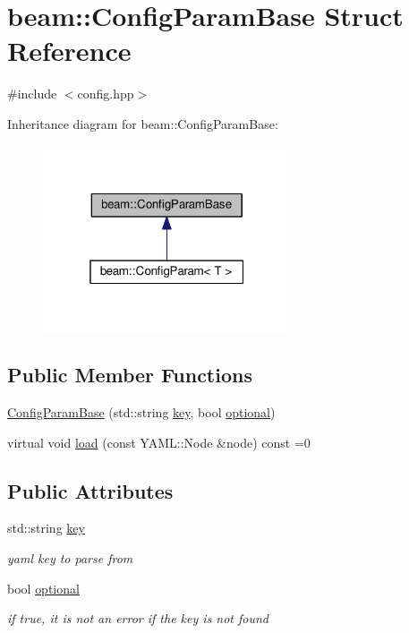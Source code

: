 \hypertarget{structbeam_1_1_config_param_base}{}\section{beam\+:\+:Config\+Param\+Base Struct Reference}
\label{structbeam_1_1_config_param_base}


{\ttfamily \#include $<$config.\+hpp$>$}



Inheritance diagram for beam\+:\+:Config\+Param\+Base\+:\nopagebreak
\begin{figure}[H]
\begin{center}
\leavevmode
\includegraphics[width=208pt]{structbeam_1_1_config_param_base__inherit__graph}
\end{center}
\end{figure}
\subsection*{Public Member Functions}
\begin{DoxyCompactItemize}
\item 
\hyperlink{structbeam_1_1_config_param_base_a9dbdaedbcc8610bd09390d570490a243}{Config\+Param\+Base} (std\+::string \hyperlink{structbeam_1_1_config_param_base_afbf349bc86d925088544d04a24c484b0}{key}, bool \hyperlink{structbeam_1_1_config_param_base_a4c73616a18786e1885265a02dbf8b9a5}{optional})
\item 
virtual void \hyperlink{structbeam_1_1_config_param_base_af4d235d401db493e99acf96065d36c73}{load} (const Y\+A\+M\+L\+::\+Node \&node) const =0
\end{DoxyCompactItemize}
\subsection*{Public Attributes}
\begin{DoxyCompactItemize}
\item 
std\+::string \hyperlink{structbeam_1_1_config_param_base_afbf349bc86d925088544d04a24c484b0}{key}
\begin{DoxyCompactList}\small\item\em yaml key to parse from \end{DoxyCompactList}\item 
bool \hyperlink{structbeam_1_1_config_param_base_a4c73616a18786e1885265a02dbf8b9a5}{optional}
\begin{DoxyCompactList}\small\item\em if true, it is not an error if the key is not found \end{DoxyCompactList}\end{DoxyCompactItemize}
